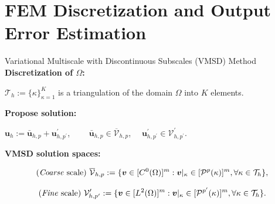 \documentclass{beamer}
\newcounter{sectionframes}
\newcommand{\setsectionframes}[1]{%
  \setcounter{sectionframes}{#1}%
}
\newcounter{sectionframecount}
\begin{document}
\section{FEM Discretization and Output Error Estimation}

\setsectionframes{7}



\begin{frame}[t]{Variational Multiscale with Discontinuous Subscales (VMSD) Method}
  \textbf{Discretization of $\Omega$:}

  \vspace{5pt}
  $\mathcal{T}_h := \{\kappa\}_{\kappa = 1}^K$ is a triangulation of the domain $\Omega$ into $K$ elements.


  \vspace{10pt}
  \textbf{Propose solution:}

  $\boldsymbol{u}_h := \bar{\boldsymbol{u}}_{h,p} + \boldsymbol{u}_{h,p^\prime}^\prime$, ~~~~$\bar{\boldsymbol{u}}_{h,p} \in \overline{\mathcal{V}}_{h,p}$,~~ $\boldsymbol{u}^\prime_{h,p^\prime} \in \mathcal{V}^\prime_{h,p^\prime}$.

  \vspace{10pt}
  \textbf{VMSD solution spaces:}

  \vspace{-15pt}
  \begin{equation}
    \text{(\textit{Coarse} scale) } \overline{\mathcal{V}}_{h,p} := \{\boldsymbol{v}\in [C^0(\Omega)]^m : \boldsymbol{v}|_\kappa \in [\mathcal{P}^p(\kappa)]^m, \forall \kappa \in \mathcal{T}_h\},
  \end{equation}

  \vspace{-15pt}
  \begin{equation}
    \text{(\textit{Fine} scale) } \mathcal{V}^\prime_{h,p^\prime} := \{\boldsymbol{v}\in [L^2(\Omega)]^m : \boldsymbol{v}|_\kappa \in [\mathcal{P}^{p^\prime}(\kappa)]^m, \forall \kappa \in \mathcal{T}_h\}.
  \end{equation}

\end{frame}

\end{document}
